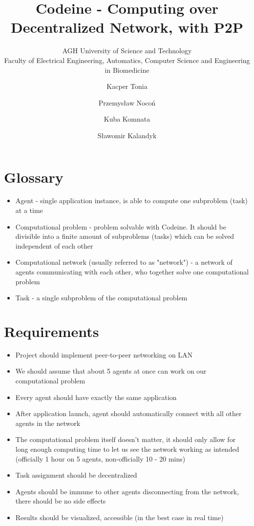 \documentclass{article}
\title{Codeine - Computing over Decentralized Network, with P2P}
\subtitle{AGH University of Science and Technology\\
    Faculty of Electrical Engineering, Automatics, Computer Science and Engineering in Biomedicine}
\author{Kacper Tonia\and
        Przemysław Nocoń\and
        Kuba Komnata\and
        Sławomir Kalandyk}
\date{}
\begin{document}
\maketitle

\section{Glossary}
\begin{itemize}
    \item Agent - single application instance, is able to compute one subproblem (task) at a time
    \item Computational problem - problem solvable with Codeine. It should be divisible into a finite amount of subproblems (tasks) which can be solved independent of each other
    \item Computational network (usually referred to as "network") - a network of agents communicating with each other, who together solve one computational problem
    \item Task - a single subproblem of the computational problem
\end{itemize}

\section{Requirements}
\begin{itemize}
    \item Project should implement peer-to-peer networking on LAN
    \item We should assume that about 5 agents at once can work on our computational problem
    \item Every agent should have exactly the same application
    \item After application launch, agent should automatically connect with all other agents in the network
    \item The computational problem itself doesn't matter, it should only allow for long enough computing time to let us see the network working as intended (officially 1 hour on 5 agents, non-officially 10 - 20 mins)
    \item Task assignment should be decentralized
    \item Agents should be immune to other agents disconnecting from the network, there should be no side effects
    \item Results should be visualized, accessible (in the best case in real time)
\end{itemize}
\end{document}
